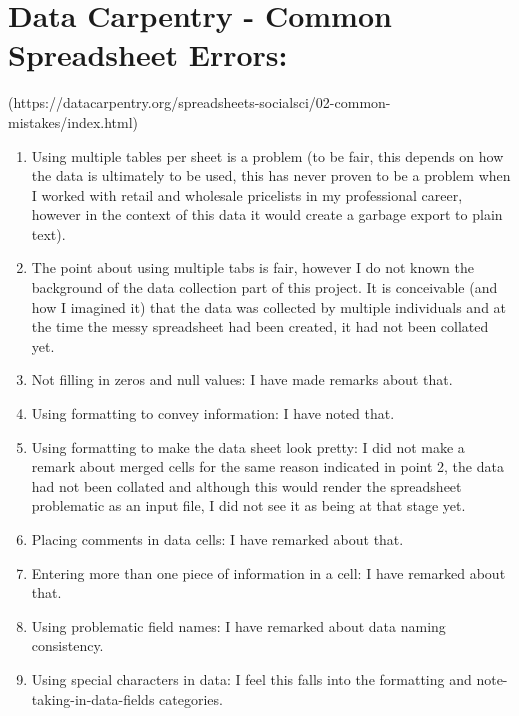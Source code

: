 \documentclass{article}
\begin{document}
\section{Data Carpentry - Common Spreadsheet Errors:}
(https://datacarpentry.org/spreadsheets-socialsci/02-common-mistakes/index.html)
\begin{enumerate}
    \item Using multiple tables per sheet is a problem (to be fair, this depends on how the data is ultimately to be used, this has never proven to be a problem when I worked with retail and wholesale pricelists in my professional career, however in the context of this data it would create a garbage export to plain text).
    \item The point about using multiple tabs is fair, however I do not known the background of the data collection part of this project. It is conceivable (and how I imagined it) that the data was collected by multiple individuals and at the time the messy spreadsheet had been created, it had not been collated yet.
    \item Not filling in zeros and null values: I have made remarks about that.
    \item Using formatting to convey information: I have noted that.
    \item Using formatting to make the data sheet look pretty: I did not make a remark about merged cells for the same reason indicated in point 2, the data had not been collated and although this would render the spreadsheet problematic as an input file, I did not see it as being at that stage yet.
    \item Placing comments in data cells: I have remarked about that.
    \item Entering more than one piece of information in a cell: I have remarked about that.
    \item Using problematic field names: I have remarked about data naming consistency.
    \item Using special characters in data: I feel this falls into the formatting and note-taking-in-data-fields categories.

\end{enumerate}
\end{document}
